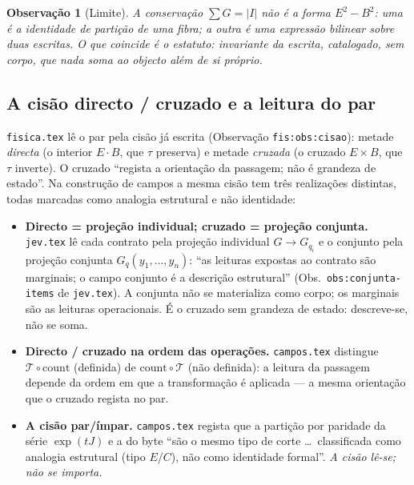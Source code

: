 \documentclass[11pt,a4paper]{article}
\newtheorem{observacao}{Observação}
\begin{document}
\begin{center}
\end{center}

\begin{observacao}[Limite]
\label{obs:limite-forma}
A conservação $\sum G=|I|$ não é a forma $E^{2}-B^{2}$: uma é a identidade de
partição de uma fibra; a outra é uma expressão bilinear sobre duas escritas. O
que coincide é o estatuto: invariante da escrita, catalogado, sem corpo, que
nada soma ao objecto além de si próprio.
\end{observacao}

\subsection{A cisão directo / cruzado e a leitura do par}

\texttt{fisica.tex} lê o par pela cisão já escrita (Observação
\texttt{fis:obs:cisao}): metade \emph{directa} (o interior $E\cdot B$, que
$\tau$ preserva) e metade \emph{cruzada} (o cruzado $E\times B$, que $\tau$
inverte). O cruzado ``regista a orientação da passagem; não é grandeza de
estado''. Na construção de campos a mesma cisão tem três realizações distintas,
todas marcadas como analogia estrutural e não identidade:

\begin{itemize}[leftmargin=1.5em]
\item \textbf{Directo = projeção individual; cruzado = projeção conjunta.}
      \texttt{jev.tex} lê cada contrato pela projeção individual
      $G\to G_{q_i}$ e o conjunto pela projeção conjunta
      $G_q(y_1,\dots,y_n)$: ``as leituras expostas ao contrato são marginais;
      o campo conjunto é a descrição estrutural'' (Obs.~\texttt{obs:conjunta-items}
      de \texttt{jev.tex}). A conjunta não se materializa como corpo; os
      marginais são as leituras operacionais. É o cruzado sem grandeza de
      estado: descreve-se, não se soma.
\item \textbf{Directo / cruzado na ordem das operações.} \texttt{campos.tex}
      distingue $\mathcal T\circ\text{count}$ (definida) de
      $\text{count}\circ\mathcal T$ (não definida): a leitura da passagem
      depende da ordem em que a transformação é aplicada --- a mesma orientação
      que o cruzado regista no par.
\item \textbf{A cisão par/ímpar.} \texttt{campos.tex} regista que a partição
      por paridade da série $\exp(tJ)$ e a do byte ``são o mesmo tipo de corte
      \ldots\ classificada como analogia estrutural (tipo $E$/$C$), não como
      identidade formal''. \emph{A cisão lê-se; não se importa.}
\end{itemize}
\end{document}
